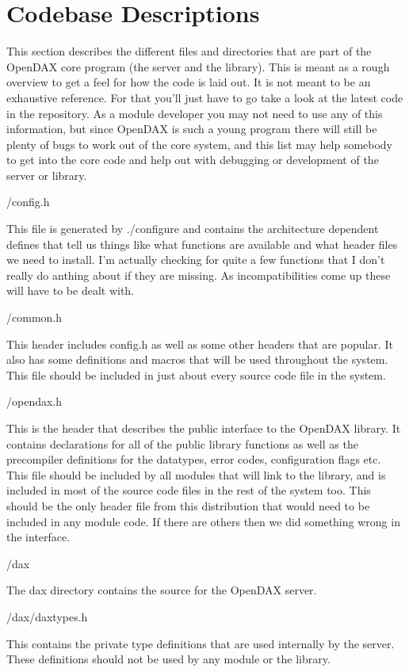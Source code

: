 \documentclass[10pt,letterpaper]{report}
\begin{document}
\appendix
\chapter{Codebase Descriptions}
This section describes the different files and directories that are part of the OpenDAX core program (the server and the library).  This is meant as a rough overview to get a feel for how the code is laid out.  It is not meant to be an exhaustive reference.  For that you'll just have to go take a look at the latest code in the repository.  As a module developer you may not need to use any of this information, but since OpenDAX is such a young program there will still be plenty of bugs to work out of the core system, and this list may help somebody to get into the core code and help out with debugging or development of the server or library.

/config.h

This file is generated by ./configure and contains the architecture dependent defines that tell us things like what functions are available and what header files we need to install. I'm actually checking for quite a few functions that I don't really do anthing about if they are missing. As incompatibilities come up these will have to be dealt with.

/common.h

This header includes config.h as well as some other headers that are popular. It also has some definitions and macros that will be used throughout the system. This file should be included in just about every source code file in the system.

/opendax.h

This is the header that describes the public interface to the OpenDAX library. It contains declarations for all of the public library functions as well as the precompiler definitions for the datatypes, error codes, configuration flags etc. This file should be included by all modules that will link to the library, and is included in most of the source code files in the rest of the system too. This should be the only header file from this distribution that would need to be included in any module code. If there are others then we did something wrong in the interface.

/dax

The dax directory contains the source for the OpenDAX server.

/dax/daxtypes.h

This contains the private type definitions that are used internally by the server. These definitions should not be used by any module or the library.
\end{document}
